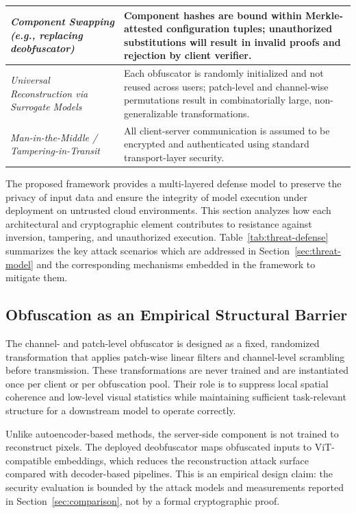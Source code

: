 \documentclass{ieeeaccess}
\newcommand{\rev}[1]{{\color{green}#1}}
\begin{document}
\begin{table}[t]
\begin{tabular}{p{} p{}}
\midrule

\textit{Component Swapping (e.g., replacing deobfuscator)} &
Component hashes are bound within Merkle-attested configuration tuples; unauthorized substitutions will result in invalid proofs and rejection by client verifier. \\

\midrule

\textit{Universal Reconstruction via Surrogate Models} &
Each obfuscator is randomly initialized and not reused across users; patch-level and channel-wise permutations result in combinatorially large, non-generalizable transformations. \\

\midrule

\textit{Man-in-the-Middle / Tampering-in-Transit} &
All client-server communication is assumed to be encrypted and authenticated using standard transport-layer security. \\

\bottomrule
\end{tabular}
\end{table}

The proposed framework provides a multi-layered defense model to preserve the privacy of input data and ensure the integrity of model execution under deployment on untrusted cloud environments. This section analyzes how each architectural and cryptographic element contributes to resistance against inversion, tampering, and unauthorized execution. Table~\ref{tab:threat-defense} summarizes the key attack scenarios which are addressed in Section~\ref{sec:threat-model} and the corresponding mechanisms embedded in the framework to mitigate them.

\subsection{\rev{Obfuscation as an Empirical Structural Barrier}}
\rev{The channel- and patch-level obfuscator is designed as a fixed, randomized transformation that applies patch-wise linear filters and channel-level scrambling before transmission. These transformations are never trained and are instantiated once per client or per obfuscation pool. Their role is to suppress local spatial coherence and low-level visual statistics while maintaining sufficient task-relevant structure for a downstream model to operate correctly.}

\rev{Unlike autoencoder-based methods, the server-side component is not trained to reconstruct pixels. The deployed deobfuscator maps obfuscated inputs to ViT-compatible embeddings, which reduces the reconstruction attack surface compared with decoder-based pipelines. This is an empirical design claim: the security evaluation is bounded by the attack models and measurements reported in Section~\ref{sec:comparison}, not by a formal cryptographic proof.}
\end{document}
